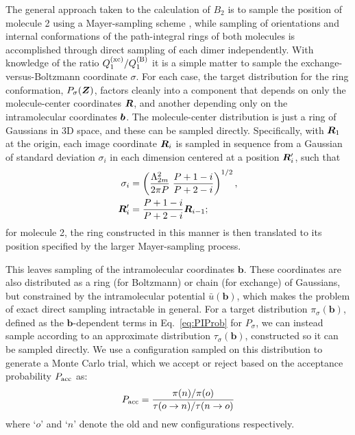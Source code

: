         \noindent The general approach taken to the calculation of $B_2$ is to sample the position of molecule 2 using a Mayer-sampling scheme \cite{Singh2004}, while sampling of orientations and internal conformations of the path-integral rings of both molecules is accomplished through direct sampling of each dimer independently. With knowledge of the ratio $Q_1^{\rm (xc)}/Q_1^{\rm (B)}$ it is a simple matter to sample the exchange-versus-Boltzmann coordinate $\sigma$. For each case, the target distribution for the ring conformation, $P_\sigma({\boldsymbol {Z}})$, factors cleanly into a component that depends on only the molecule-center coordinates ${\boldsymbol {R}}$, and another depending only on the intramolecular coordinates ${\boldsymbol {b}}$. The molecule-center distribution is just a ring of Gaussians in 3D space, and these can be sampled directly. Specifically, with ${\boldsymbol {R}}_1$ at the origin, each image coordinate ${\boldsymbol {R}}_i$ is sampled in sequence from a Gaussian of standard deviation $\sigma_i$ in each dimension centered at a position ${\boldsymbol {R}}_i'$, such that \cite{Shaul2012}
        \begin{equation}
            \begin{aligned}
                \sigma _i &= \left( \frac{\Lambda _{2m}^2}{2\pi P}\;\frac{P + 1 - i}{P + 2 - i} \right)^{1/2},\\
                {\boldsymbol {R}}_i'  &= \frac{P + 1 - i}{P + 2 - i}{{\boldsymbol {R}}_{i - 1}};
            \end{aligned}
        \end{equation}
        for molecule 2, the ring constructed in this manner is then translated to its position specified by the larger Mayer-sampling process.

        This leaves sampling of the intramolecular coordinates ${\mathbf b}$. These coordinates are also distributed as a ring (for Boltzmann) or chain (for exchange) of Gaussians, but constrained by the intramolecular potential $\bar u({\mathbf b})$, which makes the problem of exact direct sampling intractable in general. For a target distribution $\pi_\sigma({\mathbf b})$, defined as the ${\mathbf b}$-dependent terms in Eq.~\ref{eq:PIProb} for $P_\sigma$, we can instead sample according to an approximate distribution $\tau_\sigma({\mathbf b})$, constructed so it can be sampled directly. We use a configuration sampled on this distribution to generate a Monte Carlo trial, which we accept or reject based on the acceptance probability $P_{\rm acc}$ as:
        \begin{equation}
            \label{eq:Pacc}
            P_{\rm acc} = \frac{\pi(n)/\pi(o)}{\tau (o \to n)/\tau (n \to o)}
        \end{equation}
        where `$o$' and `$n$' denote the old and new configurations respectively.

